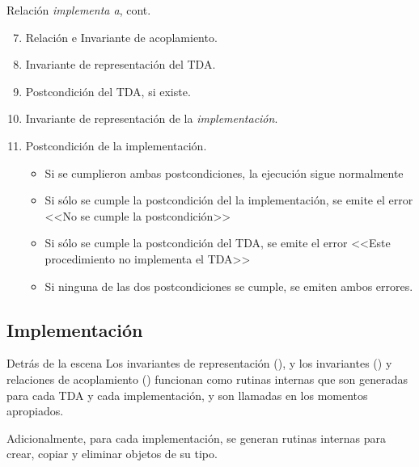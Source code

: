 \begin{frame}{Relación \textit{implementa a}, cont.}
\begin{enumerate}\setcounter{enumi}{6}
  \item Relación e Invariante de acoplamiento.

  \item Invariante de representación del TDA.

  \item Postcondición del TDA, si existe.

  \item Invariante de representación de la \textit{implementación}.

  \item Postcondición de la implementación.
    \begin{itemize}
      \item Si se cumplieron ambas postcondiciones, la ejecución sigue normalmente
      \item Si sólo se cumple la postcondición del la implementación, se emite el
      error <<No se cumple la postcondición>>
      \item Si sólo se cumple la postcondición del TDA, se emite el error <<Este
      procedimiento no implementa el TDA>>
      \item Si ninguna de las dos postcondiciones se cumple, se emiten ambos errores.
    \end{itemize}
\end{enumerate}
\end{frame}

\subsection*{Implementación}

\begin{frame}{Detrás de la escena}
Los invariantes de representación (), y los invariantes  () y relaciones de acoplamiento () funcionan como rutinas internas que son generadas para cada TDA y cada implementación, y son llamadas en los momentos apropiados. 

Adicionalmente, para cada implementación, se generan rutinas internas para crear, copiar y eliminar objetos de su tipo. 
\end{frame}

